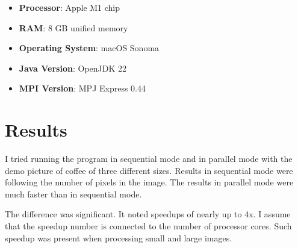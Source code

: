 \documentclass{article}
\begin{document}
\begin{multicols}{2}
    \begin{itemize}
        \item \textbf{Processor}: Apple M1 chip
        \item \textbf{RAM}: 8 GB unified memory
        \item \textbf{Operating System}: macOS Sonoma
        \item \textbf{Java Version}: OpenJDK 22
        \item \textbf{MPI Version}: MPJ Express 0.44
    \end{itemize}

    \vfill

    \section{Results}

    I tried running the program in sequential mode and in parallel mode with the demo picture of coffee of three different sizes. Results in sequential mode were following the number of pixels in the image. The results in parallel mode were much faster than in sequential mode.

    The difference was significant. It noted speedups of nearly up to 4x. I assume that the speedup number is connected to the number of processor cores. Such speedup was present when processing small and large images.


\end{multicols}
\end{document}
